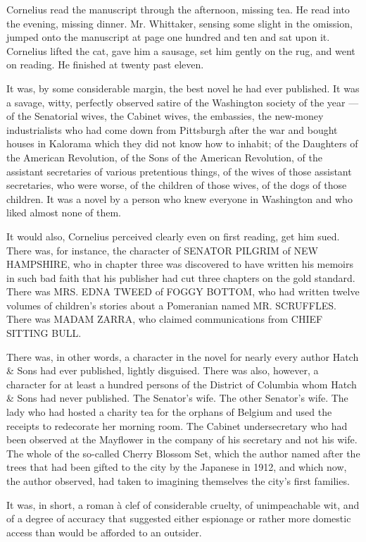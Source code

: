 \documentclass[12pt,openright]{book}
\begin{document}
Cornelius read the manuscript through the afternoon, missing tea. He read into the evening, missing dinner. Mr. Whittaker, sensing some slight in the omission, jumped onto the manuscript at page one hundred and ten and sat upon it. Cornelius lifted the cat, gave him a sausage, set him gently on the rug, and went on reading. He finished at twenty past eleven.

It was, by some considerable margin, the best novel he had ever published. It was a savage, witty, perfectly observed satire of the Washington society of the year — of the Senatorial wives, the Cabinet wives, the embassies, the new-money industrialists who had come down from Pittsburgh after the war and bought houses in Kalorama which they did not know how to inhabit; of the Daughters of the American Revolution, of the Sons of the American Revolution, of the assistant secretaries of various pretentious things, of the wives of those assistant secretaries, who were worse, of the children of those wives, of the dogs of those children. It was a novel by a person who knew everyone in Washington and who liked almost none of them.

It would also, Cornelius perceived clearly even on first reading, get him sued. There was, for instance, the character of SENATOR PILGRIM of NEW HAMPSHIRE, who in chapter three was discovered to have written his memoirs in such bad faith that his publisher had cut three chapters on the gold standard. There was MRS. EDNA TWEED of FOGGY BOTTOM, who had written twelve volumes of children’s stories about a Pomeranian named MR. SCRUFFLES. There was MADAM ZARRA, who claimed communications from CHIEF SITTING BULL.

There was, in other words, a character in the novel for nearly every author Hatch \& Sons had ever published, lightly disguised. There was also, however, a character for at least a hundred persons of the District of Columbia whom Hatch \& Sons had never published. The Senator’s wife. The other Senator’s wife. The lady who had hosted a charity tea for the orphans of Belgium and used the receipts to redecorate her morning room. The Cabinet undersecretary who had been observed at the Mayflower in the company of his secretary and not his wife. The whole of the so-called Cherry Blossom Set, which the author named after the trees that had been gifted to the city by the Japanese in 1912, and which now, the author observed, had taken to imagining themselves the city’s first families.

It was, in short, a roman à clef of considerable cruelty, of unimpeachable wit, and of a degree of accuracy that suggested either espionage or rather more domestic access than would be afforded to an outsider.
\end{document}
